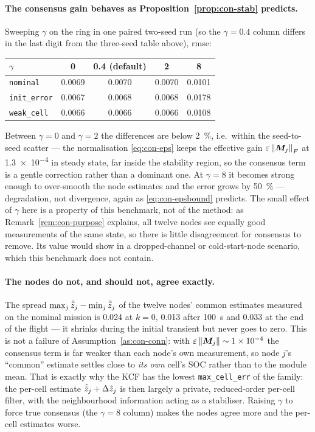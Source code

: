 \paragraph{The consensus gain behaves as Proposition~\ref{prop:con-stab} predicts.} Sweeping
$\gamma$ on the ring in one paired two-seed run (so the $\gamma=\num{0.4}$ column differs in the
last digit from the three-seed table above), rmse:
\begin{center}\small
\begin{tabular}{@{}lcccc@{}}
\toprule
$\gamma$ & 0 & 0.4 (default) & 2 & 8 \\
\midrule
\texttt{nominal}     & 0.0069 & 0.0070 & 0.0070 & 0.0101 \\
\texttt{init\_error} & 0.0067 & 0.0068 & 0.0068 & 0.0178 \\
\texttt{weak\_cell}  & 0.0066 & 0.0066 & 0.0066 & 0.0108 \\
\bottomrule
\end{tabular}
\end{center}
Between $\gamma=0$ and $\gamma=2$ the differences are below \SI{2}{\percent}, i.e.\ within the
seed-to-seed scatter --- the normalisation \eqref{eq:con-eps} keeps the effective gain
$\varepsilon\left\lVert \bm{M}_j \right\rVert_F$ at \num{1.3e-4} in steady state, far inside the stability region,
so the consensus term is a gentle correction rather than a dominant one. At
$\gamma=8$ it becomes strong enough to over-smooth the node estimates and the error grows by
\SI{50}{\percent} --- degradation, not divergence, again as \eqref{eq:con-epsbound} predicts. The
small effect of $\gamma$ here is a property of this benchmark, not of the method: as
Remark~\ref{rem:con-purpose} explains, all twelve nodes see equally good measurements of the same
state, so there is little disagreement for consensus to remove. Its value would show in a
dropped-channel or cold-start-node scenario, which this benchmark does not contain.

\paragraph{The nodes do not, and should not, agree exactly.} The spread
$\max_j\hat{\bar{z}}_j - \min_j\hat{\bar{z}}_j$ of the twelve nodes' common estimates measured
on the nominal mission is \num{0.024} at $k=0$, \num{0.013} after \SI{100}{\second} and
\num{0.033} at the end of the flight --- it shrinks during the initial transient but never goes
to zero. This is not a failure of Assumption~\ref{as:con-conn}: with $\varepsilon\left\lVert \bm{M}_j \right\rVert
\sim\num{1e-4}$ the consensus term is far weaker than each node's own measurement, so node $j$'s
``common'' estimate settles close to \emph{its own} cell's SOC rather than to the module mean. That
is exactly why the KCF has the lowest \texttt{max\_cell\_err} of the family: the per-cell estimate
$\hat{\bar{z}}_j+\Delta\hat{z}_j$ is then largely a private, reduced-order per-cell filter, with
the neighbourhood information acting as a stabiliser. Raising $\gamma$ to force true consensus
(the $\gamma=8$ column) makes the nodes agree more and the per-cell estimates worse.

